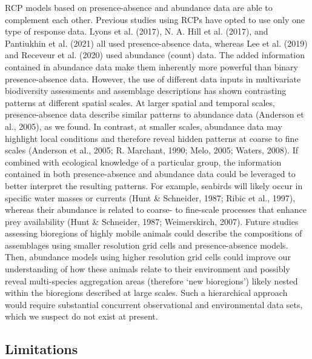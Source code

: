 \documentclass{article}
\begin{document}
\begin{linenumbers}
RCP models based on presence-absence and abundance data are able to complement each other. Previous studies using RCPs have opted to use only one type of response data. Lyons et al. (2017), N. A. Hill et al. (2017), and Pantiukhin et al. (2021) all used presence-absence data, whereas Lee et al. (2019) and Receveur et al. (2020) used abundance (count) data. The added information contained in abundance data make them inherently more powerful than binary presence-absence data. However, the use of different data inputs in multivariate biodiversity assessments and assemblage descriptions has shown contrasting patterns at different spatial scales. At larger spatial and temporal scales, presence-absence data describe similar patterns to abundance data (Anderson et al., 2005), as we found. In contrast, at smaller scales, abundance data may highlight local conditions and therefore reveal hidden patterns at coarse to fine scales (Anderson et al., 2005; R. Marchant, 1990; Melo, 2005; Waters, 2008). If combined with ecological knowledge of a particular group, the information contained in both presence-absence and abundance data could be leveraged to better interpret the resulting patterns. For example, seabirds will likely occur in specific water masses or currents (Hunt \& Schneider, 1987; Ribic et al., 1997), whereas their abundance is related to coarse- to fine-scale processes that enhance prey availability (Hunt \& Schneider, 1987; Weimerskirch, 2007). Future studies assessing bioregions of highly mobile animals could describe the compositions of assemblages using smaller resolution grid cells and presence-absence models. Then, abundance models using higher resolution grid cells could improve our understanding of how these animals relate to their environment and possibly reveal multi-species aggregation areas (therefore `new bioregions') likely nested within the bioregions described at large scales. Such a hierarchical approach would require substantial concurrent observational and environmental data sets, which we suspect do not exist at present.

\hypertarget{limitations}{%
\subsection{Limitations}\label{limitations}}

\label{sec:limitations}


\end{linenumbers}
\end{document}
